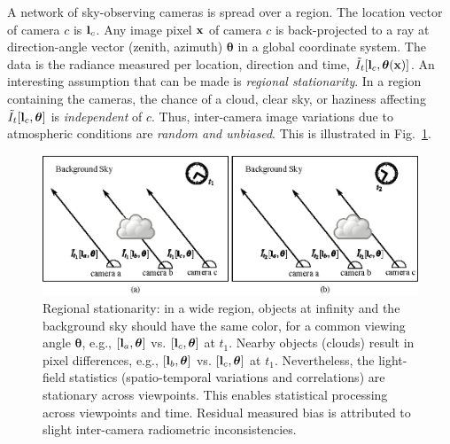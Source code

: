 \documentclass[runningheads]{llncs}
\begin{document}
A network of sky-observing cameras is spread over a region. The location vector of camera $c$ is ${\bf l}_c$. Any image pixel ${\bf x}$ of camera $c$ is back-projected to a ray at direction-angle vector (zenith, azimuth) ${\bm \theta}$ in a global coordinate system. The data is the radiance measured per location, direction and time, $\tilde I_t[{\bf l}_c,{\bm \theta}(\bf x)]$.
An interesting assumption that can be made is {\em regional stationarity}. In a region containing the cameras, the chance of a cloud, clear sky, or haziness affecting $\tilde I_t[{\bf l}_c,{\bm \theta}]$ is {\em independent} of $c$. Thus, inter-camera image variations due to atmospheric conditions are {\em random and unbiased}. This is illustrated in Fig.~\ref{fig:station}.
\begin{figure}[t!]
  \begin{center}
    \includegraphics[width=\linewidth]{regional_stationarity.eps}
  \end{center}
  \vspace{-0.6cm}
  \caption{  %
    Regional stationarity: in a wide
    region, objects at infinity and the background
    sky should have the same color, for a common viewing angle ${\bm
      \theta}$, e.g.,
    $[{\bf l}_a,{\bm \theta}]$ vs. $[{\bf l}_c,{\bm \theta}]$ at $t_1$.
    Nearby objects (clouds) result in pixel differences, e.g.,
    $[{\bf l}_b,{\bm \theta}]$ vs. $[{\bf l}_c,{\bm \theta}]$ at $t_1$.
    Nevertheless, the light-field statistics (spatio-temporal variations and correlations) are stationary across viewpoints. This enables statistical processing  across viewpoints and time.  Residual measured bias is
    attributed to slight inter-camera radiometric inconsistencies.  }
  \label{fig:station}
\end{figure}
\end{document}

